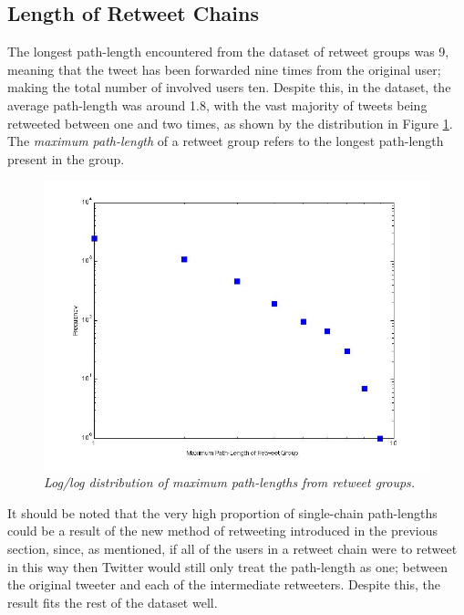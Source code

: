 \subsection{Length of Retweet Chains}
\label{length of retweet chains}
The longest path-length encountered from the dataset of retweet groups was 9, meaning that the tweet has been forwarded nine times from the original user; making the total number of involved users ten. Despite this, in the dataset, the average path-length was around 1.8, with the vast majority of tweets being retweeted between one and two times, as shown by the distribution in Figure \ref{fig:pathlength-distribution}. The \textit{maximum path-length} of a retweet group refers to the longest path-length present in the group.\\
\begin{figure}[h]
\includegraphics[scale=0.35]{4.Chapter1/Media/pathlength-distribution.jpg} 
\caption{\textit{Log/log distribution of maximum path-lengths from retweet groups.}}
\label{fig:pathlength-distribution}
\end{figure}
It should be noted that the very high proportion of single-chain path-lengths could be a result of the new method of retweeting introduced in the previous section, since, as mentioned, if all of the users in a retweet chain were to retweet in this way then Twitter would still only treat the path-length as one; between the original tweeter and each of the intermediate retweeters. Despite this, the result fits the rest of the dataset well.\\
